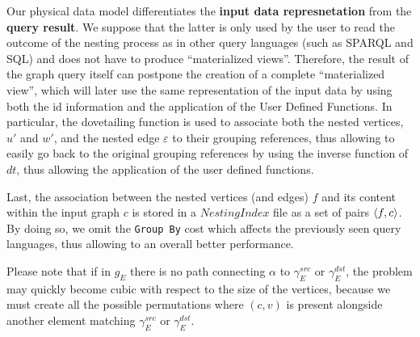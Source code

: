

Our physical data model differentiates the \textbf{input data  represnetation} from the \textbf{query result}. 
We suppose that the latter is only used by the user to read the outcome of the nesting process as in other  query languages (such as SPARQL and SQL) and does not have to
produce ``materialized views''. Therefore, the result of the graph query itself can postpone the creation of a complete ``materialized view'', which will later use the same representation of the input data by using both the id information and the application of the User Defined Functions. In particular, the dovetailing function is used to associate both the nested vertices, $u'$ and $w'$, and the nested edge $\varepsilon$ to their grouping references, thus allowing to easily go back to the original grouping references by using the inverse function of $dt$, thus allowing the application of the user defined functions.


Last, the association between the nested vertices (and edges) $f$ and its content within the input graph $c$ is stored in a $NestingIndex$ file as a set of pairs $\Braket{f,c}$. By doing so, we omit the \texttt{Group By} cost which affects the previously seen query languages, thus allowing to an overall better performance. 



Please note that if in $g_E$ there is no path connecting $\alpha$ to $\gamma_E^{src}$ or $\gamma_E^{dst}$, the problem may quickly become cubic with respect to the size of the vertices, because we must create all the possible permutations where $(c,v)$ is present alongside another element matching $\gamma_E^{src}$ or $\gamma_E^{dst}$.